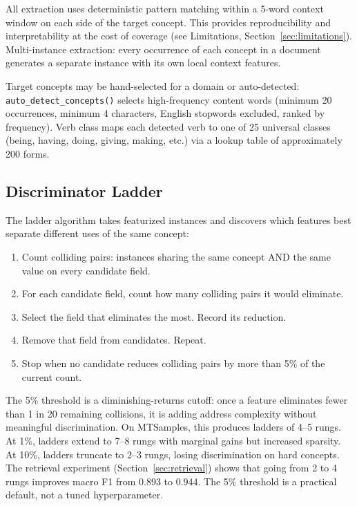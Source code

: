 \documentclass[11pt,a4paper]{article}
\begin{document}
All extraction uses deterministic pattern matching within a 5-word context window on each side of the target concept. This provides reproducibility and interpretability at the cost of coverage (see Limitations, Section~\ref{sec:limitations}). Multi-instance extraction: every occurrence of each concept in a document generates a separate instance with its own local context features.

Target concepts may be hand-selected for a domain or auto-detected: \texttt{auto\_detect\_concepts()} selects high-frequency content words (minimum 20 occurrences, minimum 4 characters, English stopwords excluded, ranked by frequency). Verb class maps each detected verb to one of 25 universal classes (being, having, doing, giving, making, etc.) via a lookup table of approximately 200 forms.

\subsection{Discriminator Ladder}

The ladder algorithm takes featurized instances and discovers which features best separate different uses of the same concept:

\begin{enumerate}
\item Count colliding pairs: instances sharing the same concept AND the same value on every candidate field.
\item For each candidate field, count how many colliding pairs it would eliminate.
\item Select the field that eliminates the most. Record its reduction.
\item Remove that field from candidates. Repeat.
\item Stop when no candidate reduces colliding pairs by more than 5\% of the current count.
\end{enumerate}

The 5\% threshold is a diminishing-returns cutoff: once a feature eliminates fewer than 1 in 20 remaining collisions, it is adding address complexity without meaningful discrimination. On MTSamples, this produces ladders of 4--5 rungs. At 1\%, ladders extend to 7--8 rungs with marginal gains but increased sparsity. At 10\%, ladders truncate to 2--3 rungs, losing discrimination on hard concepts. The retrieval experiment (Section~\ref{sec:retrieval}) shows that going from 2 to 4 rungs improves macro F1 from 0.893 to 0.944. The 5\% threshold is a practical default, not a tuned hyperparameter.
\end{document}
